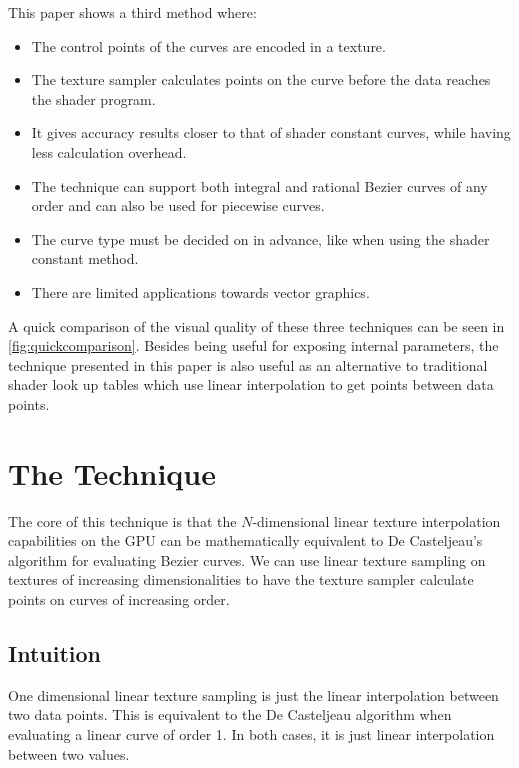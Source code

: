 \documentclass{jcgt}
\begin{document}
This paper shows a third method where:
\begin{itemize}
  \item The control points of the curves are encoded in a texture.
  \item The texture sampler calculates points on the curve before the data reaches the shader program.
  \item It gives accuracy results closer to that of shader constant curves, while having less calculation overhead.
  \item The technique can support both integral and rational Bezier curves of any order and can also be used for piecewise curves.
  \item The curve type must be decided on in advance, like when using the shader constant method.
  \item There are limited applications towards vector graphics.
\end{itemize}

A quick comparison of the visual quality of these three techniques can be seen in \autoref{fig:quickcomparison}.  Besides being useful for exposing internal parameters, the technique presented in this paper is also useful as an alternative to traditional shader look up tables which use linear interpolation to get points between data points.

\section{The Technique}
\label{sec:thetechnique}

The core of this technique is that the $N$-dimensional linear texture interpolation capabilities on the GPU can be mathematically equivalent to De Casteljeau's algorithm for evaluating Bezier curves.  We can use linear texture sampling on textures of increasing dimensionalities to have the texture sampler calculate points on curves of increasing order.

\subsection{Intuition}

One dimensional linear texture sampling is just the linear interpolation between two data points.  This is equivalent to the De Casteljeau algorithm when evaluating a linear curve of order 1.  In both cases, it is just linear interpolation between two values.
\end{document}
